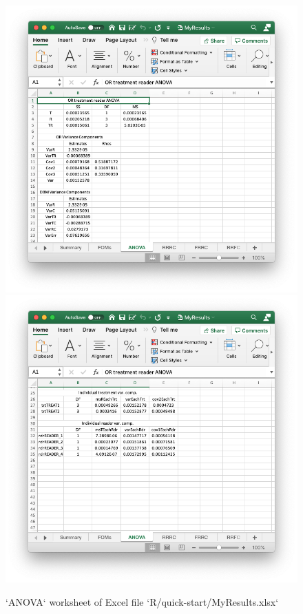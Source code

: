 \documentclass[
]{book}
\begin{document}
\begin{figure}

{\centering \includegraphics[width=0.5\linewidth,height=0.2\textheight]{R/quick-start/MyResultsANOVA1} \includegraphics[width=0.5\linewidth,height=0.2\textheight]{R/quick-start/MyResultsANOVA2} 

}

\caption{`ANOVA` worksheet of Excel file `R/quick-start/MyResults.xlsx`}\label{fig:quick-start-or-xlsx2}
\end{figure}
\end{document}
